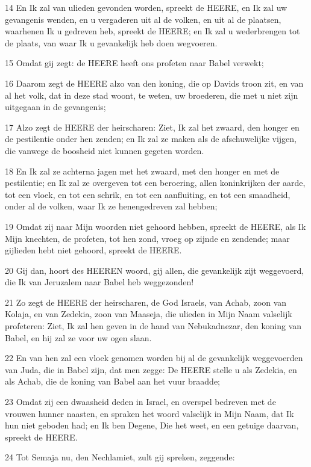 \par 14 En Ik zal van ulieden gevonden worden, spreekt de HEERE, en Ik zal uw gevangenis wenden, en u vergaderen uit al de volken, en uit al de plaatsen, waarhenen Ik u gedreven heb, spreekt de HEERE; en Ik zal u wederbrengen tot de plaats, van waar Ik u gevankelijk heb doen wegvoeren.
\par 15 Omdat gij zegt: de HEERE heeft ons profeten naar Babel verwekt;
\par 16 Daarom zegt de HEERE alzo van den koning, die op Davids troon zit, en van al het volk, dat in deze stad woont, te weten, uw broederen, die met u niet zijn uitgegaan in de gevangenis;
\par 17 Alzo zegt de HEERE der heirscharen: Ziet, Ik zal het zwaard, den honger en de pestilentie onder hen zenden; en Ik zal ze maken als de afschuwelijke vijgen, die vanwege de boosheid niet kunnen gegeten worden.
\par 18 En Ik zal ze achterna jagen met het zwaard, met den honger en met de pestilentie; en Ik zal ze overgeven tot een beroering, allen koninkrijken der aarde, tot een vloek, en tot een schrik, en tot een aanfluiting, en tot een smaadheid, onder al de volken, waar Ik ze henengedreven zal hebben;
\par 19 Omdat zij naar Mijn woorden niet gehoord hebben, spreekt de HEERE, als Ik Mijn knechten, de profeten, tot hen zond, vroeg op zijnde en zendende; maar gijlieden hebt niet gehoord, spreekt de HEERE.
\par 20 Gij dan, hoort des HEEREN woord, gij allen, die gevankelijk zijt weggevoerd, die Ik van Jeruzalem naar Babel heb weggezonden!
\par 21 Zo zegt de HEERE der heirscharen, de God Israels, van Achab, zoon van Kolaja, en van Zedekia, zoon van Maaseja, die ulieden in Mijn Naam valselijk profeteren: Ziet, Ik zal hen geven in de hand van Nebukadnezar, den koning van Babel, en hij zal ze voor uw ogen slaan.
\par 22 En van hen zal een vloek genomen worden bij al de gevankelijk weggevoerden van Juda, die in Babel zijn, dat men zegge: De HEERE stelle u als Zedekia, en als Achab, die de koning van Babel aan het vuur braadde;
\par 23 Omdat zij een dwaasheid deden in Israel, en overspel bedreven met de vrouwen hunner naasten, en spraken het woord valselijk in Mijn Naam, dat Ik hun niet geboden had; en Ik ben Degene, Die het weet, en een getuige daarvan, spreekt de HEERE.
\par 24 Tot Semaja nu, den Nechlamiet, zult gij spreken, zeggende:
